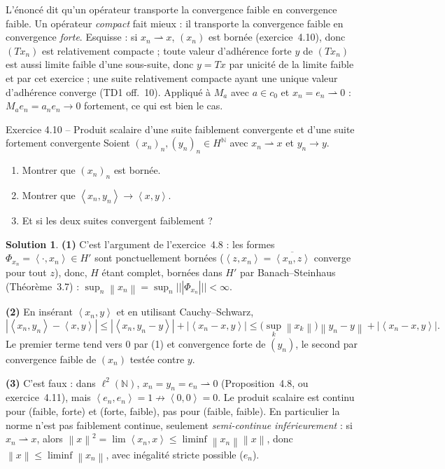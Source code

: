 \documentclass[11pt,a4paper]{article}
\newcommand{\N}{\mathbb{N}}
\newcommand{\norm}[1]{\left\|#1\right\|}
\newcommand{\opnorm}[1]{|\!|\!|#1|\!|\!|}
\newcommand{\ps}[2]{\left\langle #1,#2\right\rangle}
\theoremstyle{definition}
\newtheorem*{solution}{Solution}
\begin{document}
\begin{commentaire}
L'énoncé dit qu'un opérateur transporte la convergence faible en convergence faible. Un opérateur \emph{compact} fait mieux : il transporte la convergence faible en convergence \emph{forte}. Esquisse : si $x_n\rightharpoonup x$, $(x_n)$ est bornée (exercice~4.10), donc $(T x_n)$ est relativement compacte ; toute valeur d'adhérence forte $y$ de $(Tx_n)$ est aussi limite faible d'une sous-suite, donc $y=Tx$ par unicité de la limite faible et par cet exercice ; une suite relativement compacte ayant une unique valeur d'adhérence converge (TD1 off.~10). Appliqué à $M_a$ avec $a\in c_0$ et $x_n=e_n\rightharpoonup0$ : $M_ae_n=a_ne_n\to0$ fortement, ce qui est bien le cas.
\end{commentaire}

\begin{exo}{Exercice 4.10 -- Produit scalaire d'une suite faiblement convergente et d'une suite fortement convergente}
Soient $(x_n)_n,(y_n)_n\in H^\N$ avec $x_n\rightharpoonup x$ et $y_n\to y$.
\begin{enumerate}[label=(\arabic*)]
  \item Montrer que $(x_n)_n$ est bornée.
  \item Montrer que $\ps{x_n}{y_n}\to\ps xy$.
  \item Et si les deux suites convergent faiblement ?
\end{enumerate}
\end{exo}

\begin{solution}
\noindent\textbf{(1)} C'est l'argument de l'exercice~4.8 : les formes $\Phi_{x_n}=\ps\cdot{x_n}\in H'$ sont ponctuellement bornées ($\ps z{x_n}=\overline{\ps{x_n}z}$ converge pour tout $z$), donc, $H$ étant complet, bornées dans $H'$ par Banach--Steinhaus (Théorème~3.7) : $\sup_n\norm{x_n}=\sup_n\opnorm{\Phi_{x_n}}<\infty$.

\medskip
\noindent\textbf{(2)} En insérant $\ps{x_n}y$ et en utilisant Cauchy--Schwarz,
\[
|\ps{x_n}{y_n}-\ps xy|\le|\ps{x_n}{y_n-y}|+|\ps{x_n-x}y|\le\Big(\sup_k\norm{x_k}\Big)\norm{y_n-y}+|\ps{x_n-x}y| .
\]
Le premier terme tend vers $0$ par (1) et convergence forte de $(y_n)$, le second par convergence faible de $(x_n)$ testée contre $y$.

\medskip
\noindent\textbf{(3)} C'est faux : dans $\ell^2(\N)$, $x_n=y_n=e_n\rightharpoonup0$ (Proposition~4.8, ou exercice~4.11), mais $\ps{e_n}{e_n}=1\not\to\ps00=0$. Le produit scalaire est continu pour (faible, forte) et (forte, faible), pas pour (faible, faible). En particulier la norme n'est pas faiblement continue, seulement \emph{semi-continue inférieurement} : si $x_n\rightharpoonup x$, alors $\norm x^2=\lim\ps{x_n}x\le\liminf\norm{x_n}\norm x$, donc $\norm x\le\liminf\norm{x_n}$, avec inégalité stricte possible ($e_n$).
\end{solution}
\end{document}
